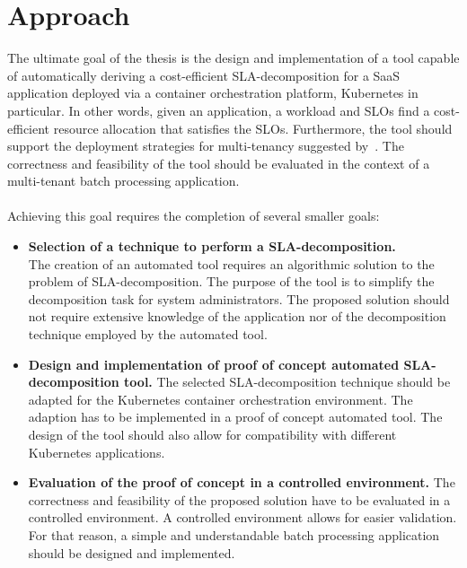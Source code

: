 \section{Approach}
\label{goals}
The ultimate goal of the thesis is the design and implementation of a tool capable of automatically deriving a cost-efficient SLA-decomposition for a SaaS application deployed via a container orchestration platform, Kubernetes in particular. In other words, given an application, a workload and SLOs find a cost-efficient resource allocation  that satisfies the SLOs. Furthermore, the tool should support the deployment strategies for multi-tenancy suggested by~\cite{TruyenEddy2016Taca}. The correctness and feasibility of the tool should be evaluated in the context of a multi-tenant batch processing application. \\\\
Achieving this goal requires the completion of several smaller goals:
\begin{itemize}
    \item \textbf{Selection of a technique to perform a SLA-decomposition.}\\
        The creation of an automated tool requires an algorithmic solution to the problem of SLA-decomposition. The purpose of the tool is to simplify the decomposition task for system administrators. The proposed solution should not require extensive knowledge of the application nor of the decomposition technique employed by the automated tool.
    \item \textbf{Design and implementation of proof of concept automated SLA-decomposition tool. }
        The selected SLA-decomposition technique should be adapted for the Kubernetes container orchestration environment. The adaption has to be implemented in a proof of concept automated tool. The design of the tool should also allow for compatibility with different Kubernetes applications. 
    \item \textbf{Evaluation of the proof of concept in a controlled environment.}
        The correctness and feasibility of the proposed solution have to be evaluated in a controlled environment. A controlled environment allows for easier validation. For that reason, a simple and understandable batch processing application should be designed and implemented. 
\end{itemize}

